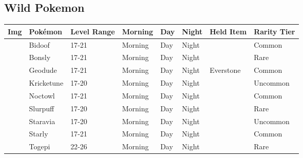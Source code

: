 \subsection{Wild Pokemon}%
\label{subsec:WildPokemon}%
\begin{longtable}{||l l l l l l l l||}%
\hline%
Img&Pokémon&Level Range&Morning&Day&Night&Held Item&Rarity Tier\\%
\hline%
\endhead%
\hline%
&Bidoof&17{-}21&Morning&Day&Night&&Common\\%
\hline%
&Bonsly&17{-}21&Morning&Day&Night&&Rare\\%
\hline%
&Geodude&17{-}21&Morning&Day&Night&Everstone&Common\\%
\hline%
&Kricketune&17{-}20&Morning&Day&Night&&Uncommon\\%
\hline%
&Noctowl&17{-}21&Morning&Day&Night&&Common\\%
\hline%
&Slurpuff&17{-}20&Morning&Day&Night&&Rare\\%
\hline%
&Staravia&17{-}20&Morning&Day&Night&&Uncommon\\%
\hline%
&Starly&17{-}21&Morning&Day&Night&&Common\\%
\hline%
&Togepi&22{-}26&Morning&Day&Night&&Rare\\%
\hline%
\end{longtable}